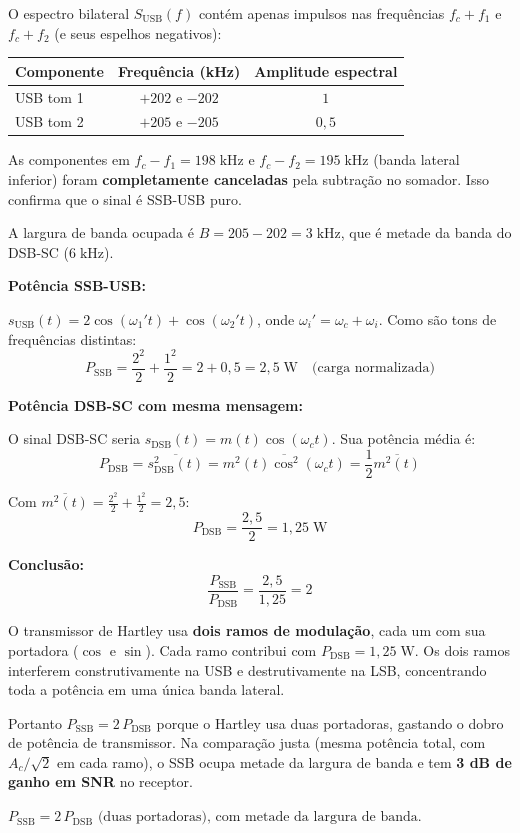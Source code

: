 \documentclass[11pt,a4paper]{article}
\begin{document}
\begin{resolucao}

O espectro bilateral $S_{\text{USB}}(f)$ contém apenas impulsos nas frequências $f_c + f_1$ e $f_c + f_2$ (e seus espelhos negativos):

\begin{center}
\small
\begin{tabular}{lcc}
  \toprule
  Componente & Frequência (kHz) & Amplitude espectral \\
  \midrule
  USB tom 1 & $+202$ e $-202$ & $1$ \\
  USB tom 2 & $+205$ e $-205$ & $0{,}5$ \\
  \bottomrule
\end{tabular}
\end{center}

As componentes em $f_c - f_1 = 198\;\text{kHz}$ e $f_c - f_2 = 195\;\text{kHz}$ (banda lateral inferior) foram \textbf{completamente canceladas} pela subtração no somador. Isso confirma que o sinal é SSB-USB puro.

A largura de banda ocupada é $B = 205 - 202 = 3\;\text{kHz}$, que é metade da banda do DSB-SC ($6\;\text{kHz}$).
\end{resolucao}

\begin{resolucao}

\textbf{Potência SSB-USB:}

$s_{\text{USB}}(t) = 2\cos(\omega_1' t) + \cos(\omega_2' t)$, onde $\omega_i' = \omega_c + \omega_i$. Como são tons de frequências distintas:
\[
  P_{\text{SSB}} = \frac{2^2}{2} + \frac{1^2}{2} = 2 + 0{,}5 = \boxed{2{,}5\;\text{W}} \quad \text{(carga normalizada)}
\]

\textbf{Potência DSB-SC com mesma mensagem:}

O sinal DSB-SC seria $s_{\text{DSB}}(t) = m(t)\cos(\omega_c t)$. Sua potência média é:
\[
  P_{\text{DSB}} = \overline{s_{\text{DSB}}^2(t)} = \overline{m^2(t)\cos^2(\omega_c t)} = \frac{1}{2}\overline{m^2(t)}
\]

Com $\overline{m^2(t)} = \frac{2^2}{2} + \frac{1^2}{2} = 2{,}5$:
\[
  P_{\text{DSB}} = \frac{2{,}5}{2} = 1{,}25\;\text{W}
\]

\textbf{Conclusão:}
\[
  \frac{P_{\text{SSB}}}{P_{\text{DSB}}} = \frac{2{,}5}{1{,}25} = 2
\]

O transmissor de Hartley usa \textbf{dois ramos de modulação}, cada um com sua portadora ($\cos$ e $\sin$). Cada ramo contribui com $P_{\text{DSB}} = 1{,}25\;\text{W}$. Os dois ramos interferem construtivamente na USB e destrutivamente na LSB, concentrando toda a potência em uma única banda lateral.

Portanto $P_{\text{SSB}} = 2\,P_{\text{DSB}}$ porque o Hartley usa duas portadoras, gastando o dobro de potência de transmissor. Na comparação justa (mesma potência total, com $A_c/\sqrt{2}$ em cada ramo), o SSB ocupa metade da largura de banda e tem \textbf{3 dB de ganho em SNR} no receptor.

$\boxed{P_{\text{SSB}} = 2\,P_{\text{DSB}} \text{ (duas portadoras), com metade da largura de banda.}}$
\end{resolucao}
\end{document}
